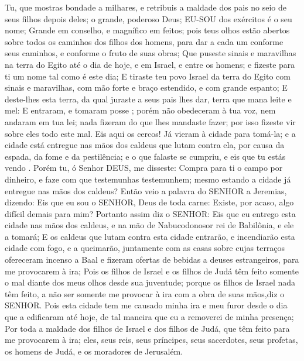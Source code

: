 {Tu, que mostras bondade a milhares, e retribuis a maldade dos pais no seio de seus filhos depois deles; o grande, poderoso Deus; EU-SOU dos exércitos é o seu nome;
Grande em conselho, e magnífico em feitos; pois teus olhos estão abertos sobre todos os caminhos dos filhos dos homens, para dar a cada um conforme seus caminhos, e conforme o fruto de suas obras;
Que puseste sinais e maravilhas na terra do Egito até o dia de hoje, e em Israel, e entre os homens; e fizeste para ti um nome
 tal como é este dia;
E tiraste teu povo Israel da terra do Egito com sinais e maravilhas, com mão forte e braço estendido, e com grande espanto;
E deste-lhes esta terra, da qual juraste a seus pais lhes dar, terra que mana leite e mel:
E entraram, e tomaram posse
{} ; porém não obedeceram à tua voz, nem andaram em tua lei; nada fizeram do que lhes mandaste fazer; por isso fizeste vir sobre eles todo este mal.
Eis aqui os cercos! Já vieram à cidade para tomá-la; e a cidade está entregue nas mãos dos caldeus que lutam contra ela, por causa da espada, da fome e da pestilência; e o que falaste se cumpriu, e eis que tu estás vendo
{} .
Porém tu, ó Senhor DEUS, me disseste: Compra para ti o campo por dinheiro, e faze com que testemunhas testemunhem; mesmo estando a cidade já entregue nas mãos dos caldeus?
Então veio a palavra do SENHOR a Jeremias, dizendo:
Eis que eu sou o SENHOR, Deus de toda carne: Existe, por acaso, algo difícil demais para mim?
Portanto assim diz o SENHOR: Eis que eu entrego esta cidade nas mãos dos caldeus, e na mão de Nabucodonosor rei de Babilônia, e ele a tomará;
E os caldeus que lutam contra esta cidade entrarão, e incendiarão esta cidade com fogo, e a queimarão, juntamente com as casas sobre cujas terraços ofereceram incenso a Baal e fizeram ofertas de bebidas a deuses estrangeiros, para me provocarem à ira;
Pois os filhos de Israel e os filhos de Judá têm feito somente o mal diante dos meus olhos desde sua juventude; porque os filhos de Israel nada têm feito, a não ser somente me provocar à ira com a obra de suas mãos,diz o SENHOR.
Pois esta cidade tem me causado minha ira e meu furor desde o dia que a edificaram até hoje, de tal maneira que eu a removerei de minha presença;
Por toda a maldade dos filhos de Israel e dos filhos de Judá, que têm feito para me provocarem à ira; eles, seus reis, seus príncipes, seus sacerdotes, seus profetas, os homens de Judá, e os moradores de Jerusalém.
}
